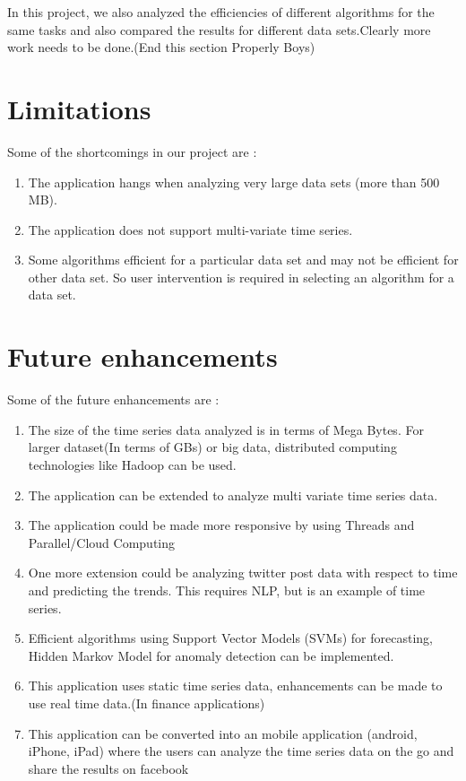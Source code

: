 \documentclass[12pt]{report}
\begin{document}
In this project, we also analyzed the efficiencies of different algorithms for the same tasks and also compared the results for different data sets.Clearly more work needs to be done.(End this section Properly Boys)


\section{Limitations}
Some of the shortcomings in our project are :
\begin{enumerate}

\item{} The application hangs when analyzing very large data sets (more than 500 MB).
\item{} The application does not support multi-variate time series.
\item{}Some algorithms efficient for a particular data set and may not be efficient for other data set. So user intervention is required in selecting an algorithm for a data set.
\end{enumerate}

\section{Future enhancements}
Some of the future enhancements are :
\begin{enumerate}
\item{The size of the  time series data analyzed is in terms of Mega Bytes. For larger dataset(In terms of GBs) or big data, distributed computing technologies like Hadoop can be used.}
\item{}The application can be extended to analyze multi variate time series data.
\item{The application could be made more responsive by using Threads and Parallel/Cloud Computing}
\item{One more extension could be analyzing twitter post data with respect to time and predicting the trends. This requires NLP, but is an example of time series.}
\item{Efficient algorithms using Support Vector Models (SVMs) for forecasting, Hidden Markov Model for anomaly detection can be implemented.}
\item{This application uses static time series data, enhancements can be made to use real time data.(In finance applications)}

\item{This application can be converted into an mobile application (android, iPhone, iPad) where the users can analyze the time series data on the go and share the results on facebook}

\end{enumerate}
\end{document}
